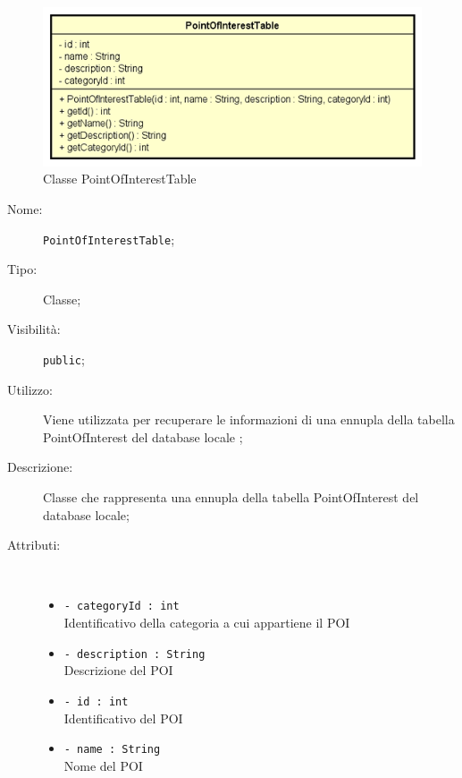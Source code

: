 \documentclass[../DefinizioneDiProdotto.tex]{subfiles}
\begin{document}
    \begin{figure}[H]
        \centering
        \includegraphics{img/PointOfInterestTable.png}
        \caption{Classe PointOfInterestTable}\label{fig:model::dataaccess::dao::PointOfInterestTable} 
    \end{figure}
    \begin{description}
\item[Nome:] \texttt{PointOfInterestTable};
\item[Tipo:] Classe;
\item[Visibilità:] \texttt{public};
\item[Utilizzo:] Viene utilizzata per recuperare le informazioni di una ennupla della tabella PointOfInterest del database locale ;
\item[Descrizione:] Classe che rappresenta una ennupla della tabella PointOfInterest del database locale;
\item[Attributi:] \
\begin{itemize}
\item \texttt{- categoryId : int}\\
Identificativo della categoria a cui appartiene il POI

\item \texttt{- description : String}\\
Descrizione del POI

\item \texttt{- id : int}\\
Identificativo del POI

\item \texttt{- name : String}\\
Nome del POI


\end{itemize}
\end{description}
\end{document}
